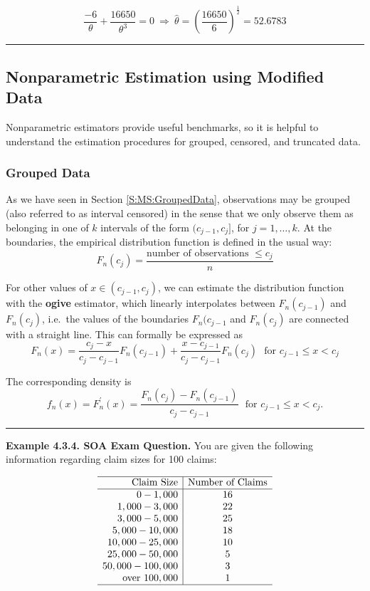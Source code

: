 \documentclass[]{book}
\theoremstyle{definition}
\theoremstyle{definition}
\theoremstyle{definition}
\theoremstyle{remark}
\begin{document}
\[\frac{-6}{\theta} + \frac{16650}{\theta^3} = 0 \ \Rightarrow \ \hat{\theta} = \left(\frac{16650}{6}\right)^{\frac{1}{2}} = 52.6783\]

\begin{center}\rule{0.5\linewidth}{\linethickness}\end{center}

\subsection{Nonparametric Estimation using Modified
Data}\label{nonparametric-estimation-using-modified-data}

Nonparametric estimators provide useful benchmarks, so it is helpful to
understand the estimation procedures for grouped, censored, and
truncated data.

\subsubsection{Grouped Data}\label{grouped-data}

As we have seen in Section \ref{S:MS:GroupedData}, observations may be
grouped (also referred to as interval censored) in the sense that we
only observe them as belonging in one of \(k\) intervals of the form
\((c_{j-1}, c_j]\), for \(j=1, \ldots, k\). At the boundaries, the
empirical distribution function is defined in the usual way:
\[F_n(c_j) = \frac{\text{number of observations } \le c_j}{n}\]

For other values of \(x \in (c_{j-1}, c_j)\), we can estimate the
distribution function with the \textbf{ogive} estimator, which linearly
interpolates between \(F_n(c_{j-1})\) and \(F_n(c_j)\), i.e.~the values
of the boundaries \(F_n(c_{j-1}\) and \(F_n(c_j)\) are connected with a
straight line. This can formally be expressed as
\[F_n(x) = \frac{c_j-x}{c_j-c_{j-1}} F_n(c_{j-1}) + \frac{x-c_{j-1}}{c_j-c_{j-1}} F_n(c_j) \ \ \ \text{for } c_{j-1} \le x < c_j\]

The corresponding density is
\[f_n(x) = F^{\prime}_n(x) = \frac{F_n(c_j)-F_n(c_{j-1})}{c_j - c_{j-1}} \ \ \  \text{for } c_{j-1} \le x < c_j .\]

\begin{center}\rule{0.5\linewidth}{\linethickness}\end{center}

\textbf{Example 4.3.4. SOA Exam Question.} You are given the following
information regarding claim sizes for 100 claims:

\[
\begin{array}{r|c}
\hline
\text{Claim Size} &  \text{Number of Claims} \\
\hline
0 - 1,000 & 16 \\
1,000 - 3,000 & 22 \\
3,000 - 5,000 & 25 \\
5,000 - 10,000 & 18 \\
10,000 - 25,000 & 10 \\
25,000 - 50,000 & 5 \\
50,000 - 100,000 & 3 \\
\text{over  } 100,000 & 1 \\
\hline
\end{array}
\]
\end{document}
